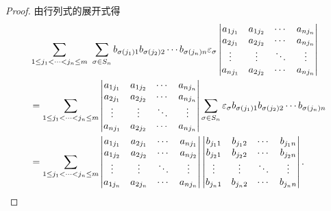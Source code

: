 \documentclass{ctexart}
\begin{document}
\begin{proof}
    由行列式的展开式得
    \begin{align*}
        & \sum\limits_{1\leq j_1<\cdots<j_n\leq m}\ \sum_{\sigma\in S_n}b_{\sigma(j_1)1}b_{\sigma(j_2)2}\cdots b_{\sigma(j_n)n}\varepsilon_\sigma\begin{vmatrix}
            a_{1j_1} & a_{1j_2} & \cdots & a_{nj_n} \\
            a_{2j_1} & a_{2j_2} & \cdots & a_{nj_n} \\
            \vdots & \vdots & \ddots & \vdots \\
            a_{nj_1} & a_{2j_2} & \cdots & a_{nj_n} \\
        \end{vmatrix} \\
        & =\sum\limits_{1\leq j_1<\cdots<j_n\leq m}\begin{vmatrix}
            a_{1j_1} & a_{1j_2} & \cdots & a_{nj_n} \\
            a_{2j_1} & a_{2j_2} & \cdots & a_{nj_n} \\
            \vdots & \vdots & \ddots & \vdots \\
            a_{nj_1} & a_{2j_2} & \cdots & a_{nj_n} \\
        \end{vmatrix}\sum_{\sigma\in S_n}\varepsilon_\sigma b_{\sigma(j_1)1}b_{\sigma(j_2)2}\cdots b_{\sigma(j_n)n} \\
        & =\sum\limits_{1\leq j_1<\cdots<j_n\leq m}\begin{vmatrix}
            a_{1j_1} & a_{2j_1} & \cdots & a_{nj_1} \\
            a_{1j_2} & a_{2j_2} & \cdots & a_{nj_2} \\
            \vdots & \vdots & \ddots & \vdots \\
            a_{1j_n} & a_{2j_n} & \cdots & a_{nj_n} \\
        \end{vmatrix}\begin{vmatrix}
            b_{j_11} & b_{j_12} & \cdots & b_{j_1n} \\
            b_{j_21} & b_{j_22} & \cdots & b_{j_2n} \\
            \vdots & \vdots & \ddots & \vdots \\
            b_{j_n1} & b_{j_n2} & \cdots & b_{j_nn} \\
        \end{vmatrix}.\qedhere
    \end{align*}
\end{proof}
\end{document}
